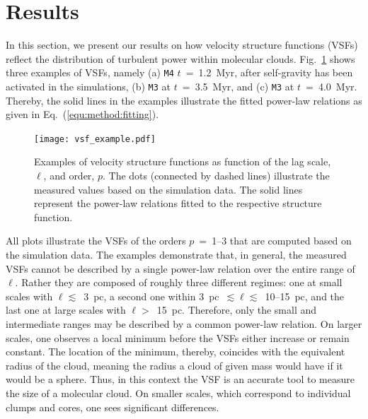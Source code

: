\section{Results}\label{results}

In this section, we present our results on how velocity structure functions (VSFs) reflect the distribution of turbulent power within molecular clouds.
Fig.~\ref{pic:results:vsf_example} shows three examples of VSFs, namely (a) \texttt{M4} $t$~=~1.2~Myr, after self-gravity has been activated in the simulations, (b) \texttt{M3} at $t$~=~3.5~Myr, and (c) \texttt{M3} at $t$~=~4.0~Myr.
Thereby, the solid lines in the examples illustrate the fitted power-law relations as given in Eq.~(\ref{equ:method:fitting}).

\begin{figure}[!htb]
	\centering
	\texttt{[image: vsf\_example.pdf]}
    \caption{Examples of velocity structure functions as function of the lag scale, $\ell$, and order, $p$. 
    	The dots (connected by dashed lines) illustrate the measured values based on the simulation data. 
        The solid lines represent the power-law relations fitted to the respective structure function.
	}
    \label{pic:results:vsf_example}
\end{figure}

All plots illustrate the VSFs of the orders $p$~=~1--3 that are computed based on the simulation data.
The examples demonstrate that, in general, the measured VSFs cannot be described by a single power-law relation over the entire range of $\ell$.
Rather they are composed of roughly three different regimes: 
one at small scales with $\ell \lesssim$~3~pc, a second one within 3~pc~$\lesssim \ell \lesssim$~10--15~pc, and the last one at large scales with $\ell >$~15~pc.
Therefore, only the small and intermediate ranges may be described by a common power-law relation.
On larger scales, one observes a local minimum before the VSFs either increase or remain constant.
The location of the minimum, thereby, coincides with the equivalent radius of the cloud, meaning the radius a cloud of given mass would have if it would be a sphere.
Thus, in this context the VSF is an accurate tool to measure the size of a molecular cloud.
On smaller scales, which correspond to individual clumps and cores, one sees significant differences.

